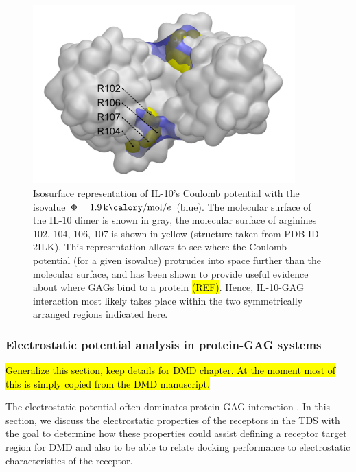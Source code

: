 \begin{figure}
\centering
\includegraphics[width=0.9\textwidth]{gfx/bspred/SI_figure_IL-10_coulomb_isosurface_1_9kcalmol.png}
\caption[]{
Isosurface representation of IL-10's Coulomb potential with the isovalue $\Phi =
\SI{1.9}{\kilo\calory\per\mole\per\elementarycharge}$ (blue). The molecular
surface of the IL-10 dimer is shown in gray, the molecular surface of arginines
102, 104, 106, 107 is shown in yellow (structure taken from PDB ID 2ILK). This
representation allows to see where the Coulomb potential (for a given isovalue)
protrudes into space further than the molecular surface, and has been shown to
provide useful evidence about where GAGs bind to a protein \hl{(REF)}. Hence,
IL-10-GAG interaction most likely takes place within the two symmetrically
arranged regions indicated here.
}
\label{fig:bspred:il10_estatic_pred}
\end{figure}




\subsubsection{Electrostatic potential analysis in protein-GAG systems}

\hl{Generalize this section, keep details for DMD chapter. At the moment most of
this is simply copied from the DMD manuscript.}

The electrostatic potential often dominates protein-GAG interaction
\cite{gandhi_structure_2008}. In this section, we discuss the electrostatic
properties of the receptors in the TDS with the goal to determine how these
properties could assist defining a receptor target region for DMD and also to be
able to relate docking performance to electrostatic characteristics of the
receptor.


